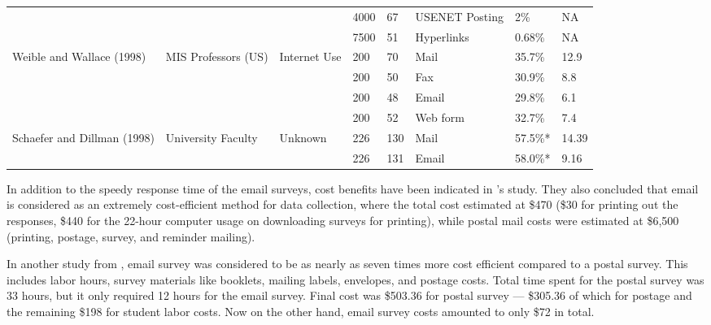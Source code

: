 \begin{center}
\begin{longtable}{ | p{2cm} | p{2cm} | p{2cm} | p{0.75cm} | p{0.75cm} | p{1cm} | p{1cm} | p{0.5cm} | }
	&  &  & 4000 & 67 & USENET Posting & 2\% & NA \\ \cline{4-8}
	&  &  & 7500 & 51 & Hyperlinks & 0.68\% & NA \\ \hline 
    \multirow{4}{2cm}{Weible and Wallace (1998)} & \multirow{4}{2cm}{MIS Professors (US)} & \multirow{4}{2cm}{Internet Use} & 200 & 70 & Mail & 35.7\% & 12.9 \\ \cline{4-8}
	&  &  & 200 & 50 & Fax & 30.9\% & 8.8 \\ \cline{4-8}
	&  &  & 200 & 48 & Email & 29.8\% & 6.1 \\ \cline{4-8}
	&  &  & 200 & 52 & Web form & 32.7\% & 7.4 \\ \hline
    \multirow{2}{2cm}{Schaefer and Dillman (1998)} & \multirow{2}{2cm}{University Faculty} & \multirow{2}{2cm}{Unknown} & 226 & 130 & Mail & 57.5\%* & 14.39 \\ \cline{4-8}
	&  &  & 226 & 131 & Email & 58.0\%* & 9.16 \\ \hline
    \end{longtable}
\end{center}


In addition to the speedy response time of the email surveys, cost benefits have been indicated in \citeauthor{Sheehan2006}'s \citeyearpar{Sheehan2006} study. They also concluded that email is considered as an extremely cost-efficient method for data collection, where the total cost estimated at \$470 (\$30 for printing out the responses, \$440 for the 22-hour computer usage on downloading surveys for printing), while postal mail costs were estimated at \$6,500 (printing, postage, survey, and reminder mailing).
\vspace{1cm}

In another study from \cite{Mavis1998}, email survey was considered to be as nearly as seven times more cost efficient compared to a postal survey. This includes labor hours, survey materials like booklets, mailing labels, envelopes, and postage costs. Total time spent for the postal survey was 33 hours, but it only required 12 hours for the email survey. Final cost was \$503.36 for postal survey --- \$305.36 of which for postage and the remaining \$198 for student labor costs. Now on the other hand, email survey costs amounted to only \$72 in total.
\vspace{1cm}

